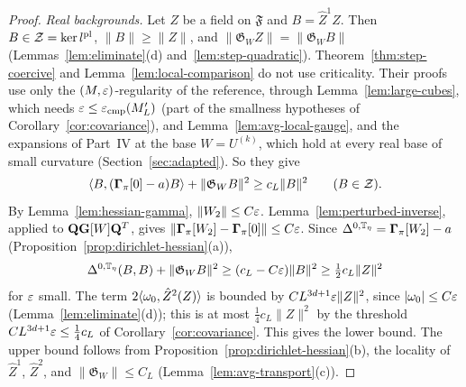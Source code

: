 \begin{proof}
\emph{Real backgrounds.} Let $Z$ be a field on $\mathfrak F$ and $B=\hat Z^1Z$. Then $B\in\mathcal Z=\ker l^{\rm pl}$, $\|B\|\ge\|Z\|$, and $\|\mathfrak G_WZ\|=\|\mathfrak G_WB\|$ (Lemmas~\ref{lem:eliminate}(d) and~\ref{lem:step-quadratic}). Theorem~\ref{thm:step-coercive} and Lemma~\ref{lem:local-comparison} do not use criticality. Their proofs use only the $(M,\varepsilon)$-regularity of the reference, through Lemma~\ref{lem:large-cubes}, which needs $\varepsilon\le\varepsilon_{\rm cmp}(M'_L)$ (part of the smallness hypotheses of Corollary~\ref{cor:covariance}), and Lemma~\ref{lem:avg-local-gauge}, and the expansions of Part~IV at the base $W=U^{(k)}$, which hold at every real base of small curvature (Section~\ref{sec:adapted}). So they give
\[
\langle B,(\boldsymbol\Gamma_\pi[0]-a)B\rangle+\|\mathfrak G_WB\|^2\ge c_L\|B\|^2\qquad(B\in\mathcal Z).
\]
By Lemma~\ref{lem:hessian-gamma}, $\|W_2\|\le C\varepsilon$. Lemma~\ref{lem:perturbed-inverse}, applied to $\mathbf Q\mathbf G[W]\mathbf Q^T$, gives $\|\boldsymbol\Gamma_\pi[W_2]-\boldsymbol\Gamma_\pi[0]\|\le C\varepsilon$. Since $\Delta^{0,\mathbb T_\eta}=\boldsymbol\Gamma_\pi[W_2]-a$ (Proposition~\ref{prop:dirichlet-hessian}(a)),
\[
\Delta^{0,\mathbb T_\eta}(B,B)+\|\mathfrak G_WB\|^2\ge(c_L-C\varepsilon)\|B\|^2\ge\tfrac12c_L\|Z\|^2
\]
for $\varepsilon$ small. The term $2\langle \omega_0,\hat Z^2(Z)\rangle$ is bounded by $CL^{3d+1}\varepsilon\|Z\|^2$, since $|\omega_0|\le C\varepsilon$ (Lemma~\ref{lem:eliminate}(d)); this is at most $\frac14c_L\|Z\|^2$ by the threshold $CL^{3d+1}\varepsilon\le\frac14c_L$ of Corollary~\ref{cor:covariance}. This gives the lower bound. The upper bound follows from Proposition~\ref{prop:dirichlet-hessian}(b), the locality of $\hat Z^1$, $\hat Z^2$, and $\|\mathfrak G_W\|\le C_L$ (Lemma~\ref{lem:avg-transport}(c)).


\end{proof}

